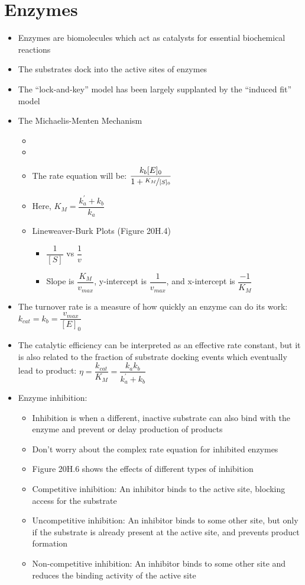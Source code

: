 \documentclass[12pt, openany, letterpaper]{memoir}
\begin{document}
\section{Enzymes}
\begin{itemize}
	\item Enzymes are biomolecules which act as catalysts for essential biochemical reactions
	\item The substrates dock into the active sites of enzymes
	\item The “lock-and-key” model has been largely supplanted by the “induced fit” model
	\item The Michaelis-Menten Mechanism
	\begin{itemize}
		\item {}
		\item {}
		\item The rate equation will be: $\dfrac{k_b[E]_0}{1 + \nicefrac{K_M}{[S]_0}}$
		\item Here, $K_M = \dfrac{k_a^\prime+k_b}{k_a}$
		\item Lineweaver-Burk Plots (Figure 20H.4)
		\begin{itemize}
			\item $\dfrac{1}{[S]}$ vs $\dfrac{1}{v}$
			\item Slope is $\dfrac{K_M}{v_{max}}$, y-intercept is $\dfrac{1}{v_{max}}$, and x-intercept is $\dfrac{-1}{K_M}$
		\end{itemize}
	\end{itemize}
	\item The turnover rate is a measure of how quickly an enzyme can do its work: $k_{cat}=k_b=\dfrac{v_{max}}{[E]_0}$
	\item The catalytic efficiency can be interpreted as an effective rate constant, but it is also related to the fraction of substrate docking events which eventually lead to product: $\eta = \dfrac{k_{cat}}{K_M}=\dfrac{k_ak_b}{k_a^\prime+k_b}$
	\item Enzyme inhibition:
	\begin{itemize}
		\item Inhibition is when a different, inactive substrate can also bind with the enzyme and prevent or delay production of products
		
		
		\item Don't worry about the complex rate equation for inhibited enzymes
		\item Figure 20H.6 shows the effects of different types of inhibition
		\item Competitive inhibition: An inhibitor binds to the active site, blocking access for the substrate
		\item Uncompetitive inhibition: An inhibitor binds to some other site, but only if the substrate is already present at the active site, and prevents product formation
		\item Non-competitive inhibition: An inhibitor binds to some other site and reduces the binding activity of the active site
	\end{itemize}
\end{itemize}
\end{document}
